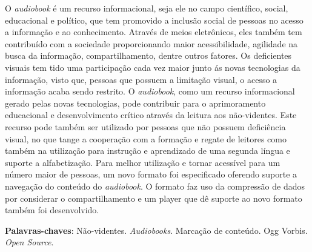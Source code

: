 \begin{resumo}


O \textit{audiobook} é um recurso informacional, seja ele no campo científico, social, educacional e político, que tem promovido a inclusão social de pessoas no acesso a informação e ao conhecimento. Através de meios eletrônicos, eles também tem contribuído com a sociedade proporcionando maior acessibilidade, agilidade na busca da informação, compartilhamento, dentre outros fatores. Os deficientes visuais tem tido uma participação cada vez maior junto ás novas tecnologias da informação, visto que, pessoas que possuem a limitação visual, o acesso a informação acaba sendo restrito. O \textit{audiobook}, como um recurso informacional gerado pelas novas tecnologias, pode contribuir para o aprimoramento educacional e desenvolvimento crítico através da leitura aos não-videntes. Este recurso pode também ser utilizado por pessoas que não possuem deficiência visual, no que tange a cooperação com a formação e regate de leitores como também na utilização para instrução e aprendizado de uma segunda língua e suporte a alfabetização. Para melhor utilização e tornar acessível para um número maior de pessoas, um novo formato foi especificado oferendo suporte a navegação do conteúdo do \textit{audiobook}. O formato faz uso da compressão de dados por considerar o compartilhamento e um player que dê suporte ao novo formato também foi desenvolvido.

 \vspace{\onelineskip}
    
 \noindent
 \textbf{Palavras-chaves}: Não-videntes. \textit{Audiobooks}. Marcação de conteúdo. Ogg Vorbis. \textit{Open Source}.
\end{resumo}
